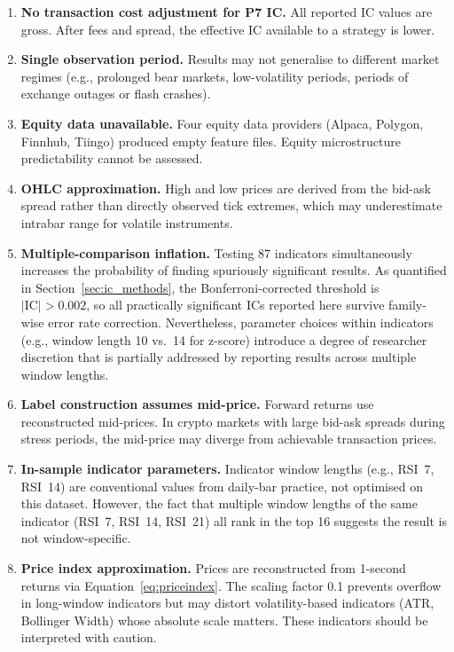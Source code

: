 \documentclass[12pt,a4paper]{article}
\theoremstyle{definition}
\theoremstyle{remark}
\newcommand{\IC}{\mathrm{IC}}
\begin{document}
\begin{enumerate}
  \item \textbf{No transaction cost adjustment for P7 IC.}
    All reported IC values are gross. After fees and spread, the
    effective IC available to a strategy is lower.
  \item \textbf{Single observation period.}
    Results may not generalise to different market regimes (e.g.,
    prolonged bear markets, low-volatility periods, periods of
    exchange outages or flash crashes).
  \item \textbf{Equity data unavailable.}
    Four equity data providers (Alpaca, Polygon, Finnhub, Tiingo)
    produced empty feature files. Equity microstructure predictability
    cannot be assessed.
  \item \textbf{OHLC approximation.}
    High and low prices are derived from the bid-ask spread rather
    than directly observed tick extremes, which may underestimate
    intrabar range for volatile instruments.
  \item \textbf{Multiple-comparison inflation.}
    Testing 87 indicators simultaneously increases the probability
    of finding spuriously significant results. As quantified in
    Section~\ref{sec:ic_methods}, the Bonferroni-corrected threshold
    is $|\IC|>0.002$, so all practically significant ICs reported here
    survive family-wise error rate correction. Nevertheless, parameter
    choices within indicators (e.g., window length 10 vs.\ 14 for
    z-score) introduce a degree of researcher discretion that is
    partially addressed by reporting results across multiple window
    lengths.
  \item \textbf{Label construction assumes mid-price.}
    Forward returns use reconstructed mid-prices. In crypto markets
    with large bid-ask spreads during stress periods, the mid-price
    may diverge from achievable transaction prices.
  \item \textbf{In-sample indicator parameters.}
    Indicator window lengths (e.g., RSI~7, RSI~14) are conventional
    values from daily-bar practice, not optimised on this dataset.
    However, the fact that multiple window lengths of the same indicator
    (RSI~7, RSI~14, RSI~21) all rank in the top 16 suggests the result
    is not window-specific.
  \item \textbf{Price index approximation.}
    Prices are reconstructed from 1-second returns via
    Equation~\eqref{eq:priceindex}. The scaling factor 0.1 prevents
    overflow in long-window indicators but may distort volatility-based
    indicators (ATR, Bollinger Width) whose absolute scale matters.
    These indicators should be interpreted with caution.
\end{enumerate}
\end{document}
